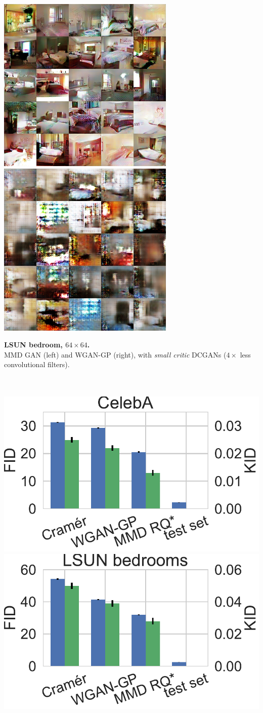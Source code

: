 \documentclass[xcolor={table}]{beamer}
\begin{document}
\begin{frame}{}
\begin{columns}[T, totalwidth=\textwidth]
\begin{column}{.32\textwidth}
    \begin{minipage}{.6\linewidth}
      \includegraphics[width=.49\linewidth]{samples/lsun_rq_16.png}
      \hfill
      \includegraphics[width=.49\linewidth]{samples/lsun_wgan_16.png}
    \end{minipage}
    \begin{minipage}{.39\linewidth}\raggedright
       \textbf{LSUN bedroom, $64 \times 64$.}\\
       MMD GAN (left) and WGAN-GP (right),
       with \emph{small critic} DCGANs ($4\times$ less convolutional filters).
    \end{minipage}
    ~\\
    ~\\

    \includegraphics[width=.48\linewidth]{figs/celeba-scores.pdf}
    \hfill
    \includegraphics[width=.48\linewidth]{figs/lsun-scores.pdf}


\end{column}
\end{columns}
\end{frame}
\end{document}
